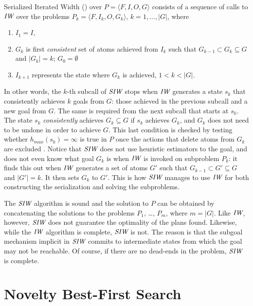 \documentclass[letterpaper]{article}
\begin{document}
\begin{definition}
Serialized Iterated Width (\SR) over $P=\langle F,I,O,G\rangle$
consists of a sequence of calls to ${\textit{IW}}$ over the problems $P_k
=\langle F,I_k,O,G_k\rangle$, $k=1, \ldots, |G|$, where

\begin{enumerate}
\item $I_1=I$,
\item $G_{k}$ is first \emph{consistent}  set of atoms  achieved from $I_k$
 such that $G_{k-1} \subset G_k \subseteq G$ and $|G_k|=k$; $G_0 = \emptyset$
\item $I_{k+1}$ represents the   state where  $G_k$ is  achieved, $1 < k < |G|$.
\end{enumerate}
\end{definition}


In other words, the $k$-th subcall of ${\textit{SIW}}$ stops when ${\textit{IW}}$ generates
a state $s_k$ that consistently achieves $k$ goals from $G$: those
achieved in the previous subcall and a new goal from $G$. The same is
required from the next subcall that starts at $s_k$.  The state $s_k$
\emph{consistently} achieves $G_k \subseteq G$ if $s_k$ achieves
$G_k$, and $G_k$ does not need to be undone in order to achieve
$G$. This last condition is checked by testing whether
$h_{max}(s_k)=\infty$ is true in $P$ once the actions that delete
atoms from $G_k$ are excluded \cite{bonet:aij-hsp}.  Notice that ${\textit{SIW}}$
does not use heuristic estimators to the goal, and does not even know
what goal $G_k$ is when ${\textit{IW}}$ is invoked on subproblem $P_k$: it finds
this out when ${\textit{IW}}$ generates a set of atoms $G'$ such that $G_{k-1}
\subset G' \subseteq G$ and $|G'|=k$. It then sets $G_k$ to $G'$. This
is how ${\textit{SIW}}$ manages to use ${\textit{IW}}$ for both constructing the
serialization and solving the subproblems.

The ${\textit{SIW}}$ algorithm is sound and the solution to $P$ can be obtained by concatenating the
solutions to the problems $P_1$, \ldots, $P_m$, where $m = |G|$. Like ${\textit{IW}}$, however,
${\textit{SIW}}$ does not guarantee the optimality of the plans found.
Likewise, while the ${\textit{IW}}$ algorithm is complete, ${\textit{SIW}}$ is not.  The reason is that the subgoal
mechanism implicit in ${\textit{SIW}}$ commits to intermediate states from which the goal may not be reachable.
Of course, if there are no dead-ends in the problem, ${\textit{SIW}}$ is complete.



\section{Novelty Best-First Search}
\end{document}
